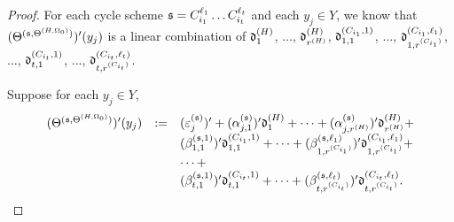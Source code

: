 \begin{appendix}
\begin{proof}
For each cycle scheme ${\mathfrak{s} }=C^{\ell_1}_{i_1} \dots C^{\ell_t}_{i_t}$ and each $y_j \in Y$, we know that $(\Theta^{({\mathfrak{s} },\Theta^{(H,\Omega_0)})})'(y_j)$ is a linear combination of $\mathfrak{d}^{(H)}_1$, $\dots$, $\mathfrak{d}^{(H)}_{r^{(H)}}$, $\mathfrak{d}^{(C_{i_1},1)}_{1,1}$, $\dots$, $\mathfrak{d}^{(C_{i_1},\ell_1)}_{1,r^{(C_{i_1})}}$, $\dots$, $\mathfrak{d}^{(C_{i_t},1)}_{t,1}$, $\dots$, $\mathfrak{d}^{(C_{i_t},\ell_t)}_{t, r^{(C_{i_t})}}$. 


Suppose for each $y_j \in Y$,
\[
\begin{array}{l cl }
(\Theta^{({\mathfrak{s} },\Theta^{(H,\Omega_0)})})'(y_j) &:= & (\varepsilon^{({\mathfrak{s} })}_{j})'  + (\alpha^{({\mathfrak{s} })}_{j,1})' \mathfrak{d}^{(H)}_1 + \dots + (\alpha^{({\mathfrak{s} })}_{j,r^{(H)}})' \mathfrak{d}^{(H)}_{r^{(H)}} + \\
& & (\beta^{({\mathfrak{s} },1)}_{1,1})' \mathfrak{d}^{(C_{i_1},1)}_{1,1}  + \dots + (\beta^{({\mathfrak{s} },\ell_1)}_{1,r^{(C_{i_1})}})' \mathfrak{d}^{(C_{i_1},\ell_1)}_{1,r^{(C_{i_1})}}  +  \\
& & \dots + \\
& & (\beta^{({\mathfrak{s} },1)}_{t,1})' \mathfrak{d}^{(C_{i_{t}},1)}_{t,1} + \dots + (\beta^{({\mathfrak{s} },\ell_{t})}_{t,r^{(C_{i_{t}})}})' \mathfrak{d}^{(C_{i_{t}},\ell_{t})}_{t, r^{(C_{i_{t}})}}.
\end{array}
\]




\end{proof}
\end{appendix}
